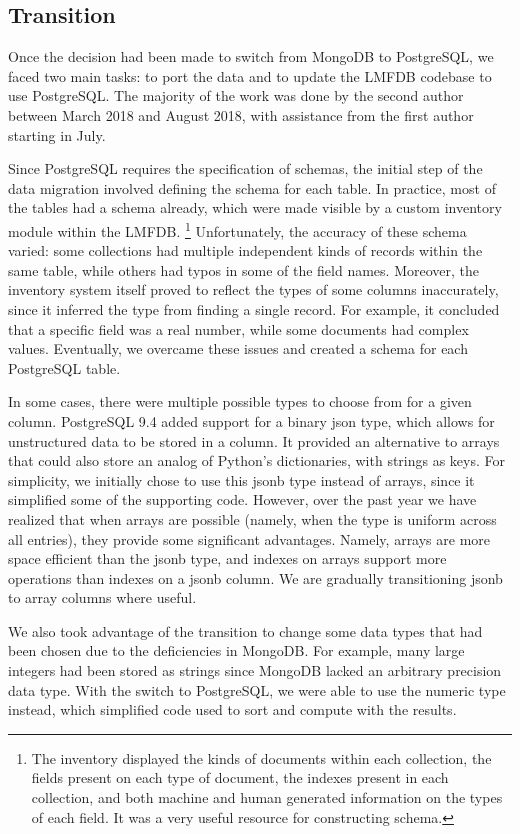 \documentclass{amsart}
\begin{document}
\subsection{Transition}

Once the decision had been made to switch from MongoDB to PostgreSQL, we faced two main tasks: to port the data and to update the LMFDB codebase to use PostgreSQL.
The majority of the work was done by the second author between March 2018 and August 2018, with assistance from the first author starting in July.

Since PostgreSQL requires the specification of schemas, the initial step of the data migration involved defining the schema for each table.
In practice, most of the tables had a schema already, which were made visible by a custom inventory module within the LMFDB.%
\footnote{The inventory displayed the kinds of documents within each collection, the fields present on each type of document, the indexes present in each collection, and both machine and human generated information on the types of each field.
It was a very useful resource for constructing schema.}
Unfortunately, the accuracy of these schema varied: some collections had multiple independent kinds of records within the same table, while others had typos in some of the field names.
Moreover, the inventory system itself proved to reflect the types of some columns inaccurately, since it inferred the type from finding a single record.
For example, it concluded that a specific field was a real number, while some documents had complex values.
Eventually, we overcame these issues and created a schema for each PostgreSQL table.

In some cases, there were multiple possible types to choose from for a given column.
PostgreSQL 9.4 added support for a binary json type, which allows for unstructured data to be stored in a column.
It provided an alternative to arrays that could also store an analog of Python's dictionaries, with strings as keys.
For simplicity, we initially chose to use this jsonb type instead of arrays, since it simplified some of the supporting code.
However, over the past year we have realized that when arrays are possible (namely, when the type is uniform across all entries), they provide some significant advantages.
Namely, arrays are more space efficient than the jsonb type, and indexes on arrays support more operations than indexes on a jsonb column.
We are gradually transitioning jsonb to array columns where useful.

We also took advantage of the transition to change some data types that had been chosen due to the deficiencies in MongoDB.
For example, many large integers had been stored as strings since MongoDB lacked an arbitrary precision data type.
With the switch to PostgreSQL, we were able to use the numeric type instead, which simplified code used to sort and compute with the results.
\end{document}
